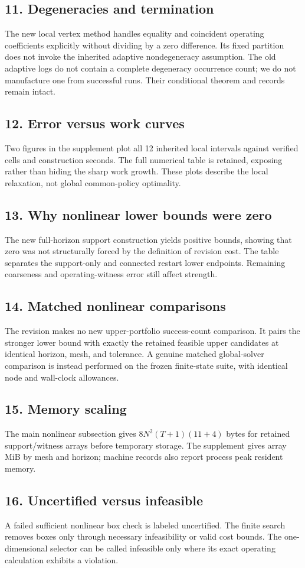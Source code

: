 \subsection{11. Degeneracies and termination}
The new local vertex method handles equality and coincident operating coefficients explicitly without dividing by a zero difference. Its fixed partition does not invoke the inherited adaptive nondegeneracy assumption. The old adaptive logs do not contain a complete degeneracy occurrence count; we do not manufacture one from successful runs. Their conditional theorem and records remain intact.
\subsection{12. Error versus work curves}
Two figures in the supplement plot all 12 inherited local intervals against verified cells and construction seconds. The full numerical table is retained, exposing rather than hiding the sharp work growth. These plots describe the local relaxation, not global common-policy optimality.
\subsection{13. Why nonlinear lower bounds were zero}
The new full-horizon support construction yields positive bounds, showing that zero was not structurally forced by the definition of revision cost. The table separates the support-only and connected restart lower endpoints. Remaining coarseness and operating-witness error still affect strength.
\subsection{14. Matched nonlinear comparisons}
The revision makes no new upper-portfolio success-count comparison. It pairs the stronger lower bound with exactly the retained feasible upper candidates at identical horizon, mesh, and tolerance. A genuine matched global-solver comparison is instead performed on the frozen finite-state suite, with identical node and wall-clock allowances.
\subsection{15. Memory scaling}
The main nonlinear subsection gives $8N^2(T+1)(11+4)$ bytes for retained support/witness arrays before temporary storage. The supplement gives array MiB by mesh and horizon; machine records also report process peak resident memory.
\subsection{16. Uncertified versus infeasible}
A failed sufficient nonlinear box check is labeled uncertified. The finite search removes boxes only through necessary infeasibility or valid cost bounds. The one-dimensional selector can be called infeasible only where its exact operating calculation exhibits a violation.
